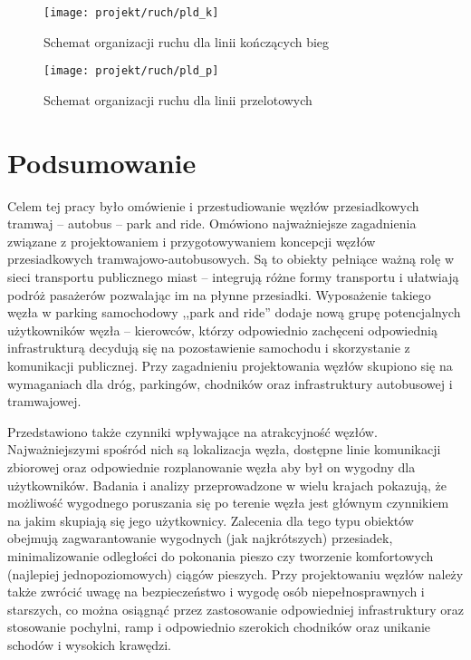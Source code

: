 \documentclass[twoside,12pt]{article}
\begin{document}
		\begin{figure}[H]
		\centering
		\texttt{[image: projekt/ruch/pld\_k]}
		\caption{Schemat organizacji ruchu dla linii kończących bieg}
		
		\label{ruch1}
		\end{figure}
		
		\begin{figure}[H]
		\centering
		\texttt{[image: projekt/ruch/pld\_p]}
		\caption{Schemat organizacji ruchu dla linii przelotowych}
		
		\label{ruch2}
		\end{figure}
		
		\clearpage
		
		\section{Podsumowanie}
		
		Celem tej pracy było omówienie i przestudiowanie węzłów przesiadkowych tramwaj -- autobus -- park and ride. Omówiono najważniejsze zagadnienia związane z projektowaniem i przygotowywaniem koncepcji węzłów przesiadkowych tramwajowo-autobusowych. Są to obiekty pełniące ważną rolę w sieci transportu publicznego miast -- integrują różne formy transportu i ułatwiają podróż pasażerów pozwalając im na płynne przesiadki. Wyposażenie takiego węzła w parking samochodowy ,,park and ride'' dodaje nową grupę potencjalnych użytkowników węzła -- kierowców, którzy odpowiednio zachęceni odpowiednią infrastrukturą decydują się na pozostawienie samochodu i skorzystanie z komunikacji publicznej. Przy zagadnieniu projektowania węzłów skupiono się na wymaganiach dla dróg, parkingów, chodników oraz infrastruktury autobusowej i tramwajowej. 
		
		Przedstawiono także czynniki wpływające na atrakcyjność węzłów. Najważniejszymi spośród nich są lokalizacja węzła, dostępne linie komunikacji zbiorowej oraz odpowiednie rozplanowanie węzła aby był on wygodny dla użytkowników. Badania i analizy przeprowadzone w wielu krajach pokazują, że możliwość wygodnego poruszania się po terenie węzła jest głównym czynnikiem na jakim skupiają się jego użytkownicy. Zalecenia dla tego typu obiektów obejmują zagwarantowanie wygodnych (jak najkrótszych) przesiadek, minimalizowanie odległości do pokonania pieszo czy tworzenie komfortowych (najlepiej jednopoziomowych) ciągów pieszych. Przy projektowaniu węzłów należy także zwrócić uwagę na bezpieczeństwo i wygodę osób niepełnosprawnych i starszych, co można osiągnąć przez zastosowanie odpowiedniej infrastruktury oraz stosowanie pochylni, ramp i odpowiednio szerokich chodników oraz unikanie schodów i wysokich krawędzi. 
		
\end{document}
